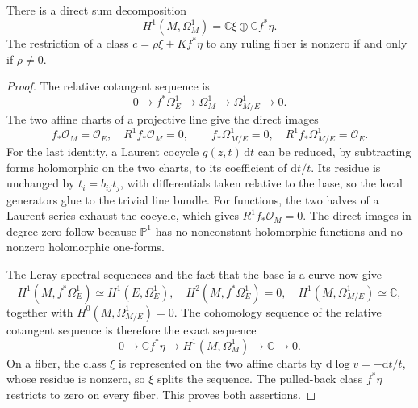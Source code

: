 \begin{lemma}\label{lem:split-elliptic-cotangent-cohomology}
There is a direct sum decomposition
\[
 H^1(M,\Omega_M^1)=\mathbb C\xi\oplus\mathbb C f^*\eta.
\]
The restriction of a class $c=\rho\xi+Kf^*\eta$ to any ruling fiber is nonzero if and only if $\rho\ne0$.
\end{lemma}
\begin{proof}
The relative cotangent sequence is
\[
 0\longrightarrow f^*\Omega_E^1\longrightarrow\Omega_M^1
      \longrightarrow\Omega_{M/E}^1\longrightarrow0.
\]
The two affine charts of a projective line give the direct images
\[
 f_*\mathcal O_M=\mathcal O_E,\quad R^1f_*\mathcal O_M=0,
 \qquad f_*\Omega_{M/E}^1=0,\quad
 R^1f_*\Omega_{M/E}^1=\mathcal O_E.
\]
For the last identity, a Laurent cocycle $g(z,t)\,\mathrm{d}t$ can be reduced, by subtracting forms holomorphic on the two charts, to its coefficient of $\mathrm{d}t/t$. Its residue is unchanged by $t_i=b_{ij}t_j$, with differentials taken relative to the base, so the local generators glue to the trivial line bundle. For functions, the two halves of a Laurent series exhaust the cocycle, which gives $R^1f_*\mathcal O_M=0$. The direct images in degree zero follow because $\mathbb P^1$ has no nonconstant holomorphic functions and no nonzero holomorphic one-forms.

The Leray spectral sequences and the fact that the base is a curve now give
\[
 H^1(M,f^*\Omega_E^1)\simeq H^1(E,\Omega_E^1),\quad
 H^2(M,f^*\Omega_E^1)=0,\quad
 H^1(M,\Omega_{M/E}^1)\simeq\mathbb C,
\]
together with $H^0(M,\Omega^1_{M/E})=0$. The cohomology sequence of the relative cotangent sequence is therefore the exact sequence
\[
 0\longrightarrow\mathbb C f^*\eta
 \longrightarrow H^1(M,\Omega_M^1)\longrightarrow\mathbb C\longrightarrow0.
\]
On a fiber, the class $\xi$ is represented on the two affine charts by $\mathrm{d}\log v=-\mathrm{d}t/t$, whose residue is nonzero, so $\xi$ splits the sequence. The pulled-back class $f^*\eta$ restricts to zero on every fiber. This proves both assertions.
\end{proof}

